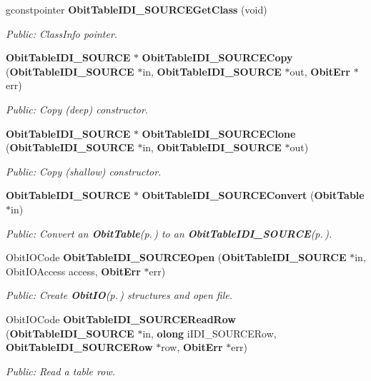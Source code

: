 \begin{CompactItemize}
gconstpointer {\bf Obit\-Table\-IDI\_\-SOURCEGet\-Class} (void)
\begin{CompactList}\small\item\em Public: Class\-Info pointer. \item\end{CompactList}\item 
{\bf Obit\-Table\-IDI\_\-SOURCE} $\ast$ {\bf Obit\-Table\-IDI\_\-SOURCECopy} ({\bf Obit\-Table\-IDI\_\-SOURCE} $\ast$in, {\bf Obit\-Table\-IDI\_\-SOURCE} $\ast$out, {\bf Obit\-Err} $\ast$err)
\begin{CompactList}\small\item\em Public: Copy (deep) constructor. \item\end{CompactList}\item 
{\bf Obit\-Table\-IDI\_\-SOURCE} $\ast$ {\bf Obit\-Table\-IDI\_\-SOURCEClone} ({\bf Obit\-Table\-IDI\_\-SOURCE} $\ast$in, {\bf Obit\-Table\-IDI\_\-SOURCE} $\ast$out)
\begin{CompactList}\small\item\em Public: Copy (shallow) constructor. \item\end{CompactList}\item 
{\bf Obit\-Table\-IDI\_\-SOURCE} $\ast$ {\bf Obit\-Table\-IDI\_\-SOURCEConvert} ({\bf Obit\-Table} $\ast$in)
\begin{CompactList}\small\item\em Public: Convert an {\bf Obit\-Table}{\rm (p.\,\pageref{structObitTable})} to an {\bf Obit\-Table\-IDI\_\-SOURCE}{\rm (p.\,\pageref{structObitTableIDI__SOURCE})}. \item\end{CompactList}\item 
Obit\-IOCode {\bf Obit\-Table\-IDI\_\-SOURCEOpen} ({\bf Obit\-Table\-IDI\_\-SOURCE} $\ast$in, Obit\-IOAccess access, {\bf Obit\-Err} $\ast$err)
\begin{CompactList}\small\item\em Public: Create {\bf Obit\-IO}{\rm (p.\,\pageref{structObitIO})} structures and open file. \item\end{CompactList}\item 
Obit\-IOCode {\bf Obit\-Table\-IDI\_\-SOURCERead\-Row} ({\bf Obit\-Table\-IDI\_\-SOURCE} $\ast$in, {\bf olong} i\-IDI\_\-SOURCERow, {\bf Obit\-Table\-IDI\_\-SOURCERow} $\ast$row, {\bf Obit\-Err} $\ast$err)
\begin{CompactList}\small\item\em Public: Read a table row. \item\end{CompactList}\item 

\end{CompactItemize}
